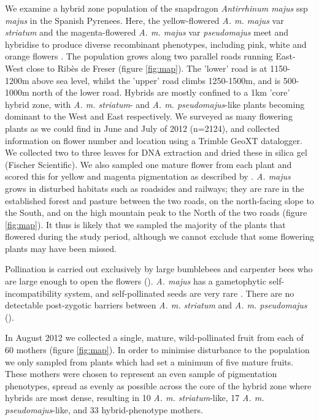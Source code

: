 \documentclass[10pt, a4paper, twocolumn]{article} %
\begin{document}
We examine a hybrid zone population of the snapdragon \textit{Antirrhinum majus} ssp \textit{majus} in the Spanish Pyrenees. Here, the yellow-flowered \textit{A. m. majus} var \textit{striatum} and the magenta-flowered \textit{A. m. majus} var \textit{pseudomajus} meet and hybridise to produce diverse recombinant phenotypes, including pink, white and orange flowers \citep{whibley2004molecular}.
The population grows along two parallel roads running East-West close to Rib\`{e}s de Freser (figure \ref{fig:map}). The ’lower’ road is at 1150-1200m above sea level, whilst the ’upper’ road climbs 1250-1500m, and is 500-1000m north of the lower road. Hybrids are mostly confined to a 1km ’core’ hybrid zone, with \textit{A. m. striatum}- and \textit{A. m. pseudomajus}-like plants becoming dominant to the West and East respectively. We surveyed as many flowering plants as we could find in June and July of 2012 (n=2124), and collected information on flower number and location using a Trimble GeoXT datalogger. We collected two to three leaves for DNA extraction and dried these in silica gel (Fischer Scientific). We also sampled one mature flower from each plant and scored this for yellow and magenta pigmentation as described by \cite{whibley2004molecular}. \textit{A. majus} grows in disturbed habitats such as roadsides and railways; they are rare in the established forest and pasture between the two roads, on the north-facing slope to the South, and on the high mountain peak to the North of the two roads (figure \ref{fig:map}). It thus is likely that we sampled the majority of the plants that flowered during the study period, although we cannot exclude that some flowering plants may have been missed. 

Pollination is carried out exclusively by large bumblebees and carpenter bees who are large enough to open the flowers (\cite{vargas2010occluded, andalo2019prevalence}). \textit{A. majus} has a gametophytic self-incompatibility system, and self-pollinated seeds are very rare \parencite{surendranadh2022effects}. There are no detectable post-zygotic barriers between \textit{A. m. striatum} and \textit{A. m. pseudomajus} (\cite{andalo2010post}).

In August 2012 we collected a single, mature, wild-pollinated fruit from each of 60 mothers (figure \ref{fig:map}). In order to minimise disturbance to the population we only sampled from plants which had set a minimum of five mature fruits. These mothers were chosen to represent an even sample of pigmentation phenotypes, spread as evenly as possible across the core of the hybrid zone where hybrids are most dense, resulting in 10 \textit{A. m. striatum}-like, 17 \textit{A. m. pseudomajus}-like, and 33 hybrid-phenotype mothers.
\end{document}

